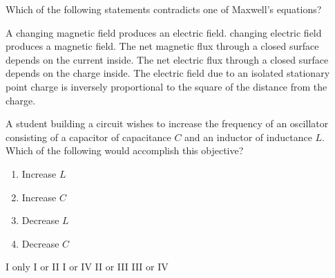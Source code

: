 \documentclass[12pt]{../oss-classkick-exam}
\begin{document}
\begin{questions}
  \uplevel{ \rule{\linewidth}{.5pt} }
  
  \question Which of the following statements contradicts one of Maxwell's
  equations?
  \begin{choices}
    \choice A changing magnetic field produces an electric field.
    \choice changing electric field produces a magnetic field.
    \choice The net magnetic flux through a closed surface depends on the
    current inside.
    \choice The net electric flux through a closed surface depends on the
    charge inside.
    \choice The electric field due to an isolated stationary point charge is
    inversely proportional to the square of the distance from the charge.
  \end{choices}
  \vspace{.7in}
  
  \uplevel{\rule{\linewidth}{.5pt}}
  
  \question A student building a circuit wishes to increase the frequency of an
  oscillator consisting of a capacitor of capacitance $C$ and an inductor of
  inductance $L$. Which of the following would accomplish this objective?
  \begin{enumerate}[nosep,label={\Roman*.}]
  \item Increase $L$
  \item Increase $C$
  \item Decrease $L$
  \item Decrease $C$
  \end{enumerate}
  \begin{choices}
    \choice I only\hspace{.3in}
    \choice I or II\hspace{.3in}
    \choice I or IV\hspace{.3in}
    \choice II or III\hspace{.3in}
    \choice III or IV
  \end{choices}
\end{questions}
\end{document}
